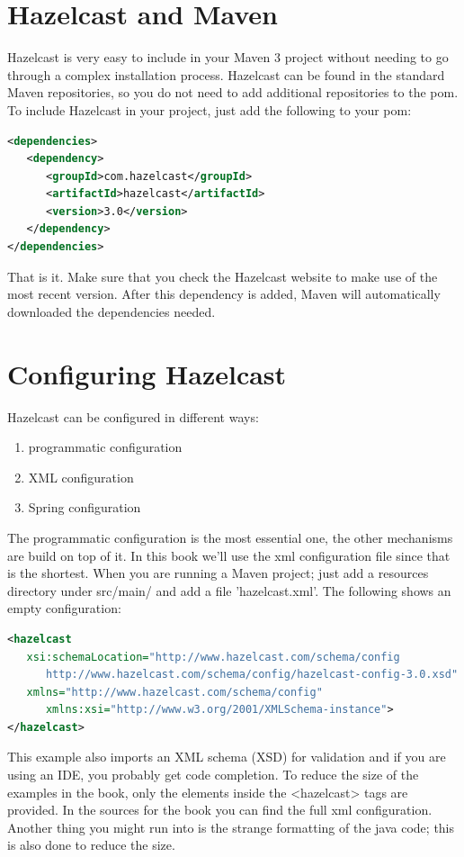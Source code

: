 \section{Hazelcast and Maven}
Hazelcast is very easy to include in your Maven 3 project without needing to go through a complex installation process. Hazelcast can be found in the standard Maven repositories, so you do not need to add additional repositories to the pom. To include Hazelcast in your project, just add the following to your pom:
\begin{lstlisting}[language=xml]
<dependencies>	
   <dependency>
      <groupId>com.hazelcast</groupId>
      <artifactId>hazelcast</artifactId>
      <version>3.0</version>
   </dependency>
</dependencies>
\end{lstlisting}
That is it. Make sure that you check the Hazelcast website to make use of the most recent version. After this dependency is added, Maven will automatically downloaded the dependencies needed.

\section{Configuring Hazelcast}
Hazelcast can be configured in different ways:
\begin{enumerate}
\item programmatic configuration
\item XML configuration 
\item Spring configuration
\end{enumerate}
The programmatic configuration is the most essential one, the other mechanisms are build on top of it. In this book we'll use the xml configuration file since that is the shortest. When you are running a Maven project; just add a resources directory under src/main/ and add a file 'hazelcast.xml'. The following shows an empty configuration:
\begin{lstlisting}[language=xml]
<hazelcast 
   xsi:schemaLocation="http://www.hazelcast.com/schema/config                               
      http://www.hazelcast.com/schema/config/hazelcast-config-3.0.xsd"
   xmlns="http://www.hazelcast.com/schema/config"
      xmlns:xsi="http://www.w3.org/2001/XMLSchema-instance">
</hazelcast>
\end{lstlisting}
This example also imports an XML schema (XSD) for validation and if you are using an IDE, you probably get code completion. To reduce the size of the examples in the book, only the elements inside the <hazelcast> tags are provided. In the sources for the book you can find the full xml configuration. Another thing you might run into is the strange formatting of the java code; this is also done to reduce the size. 

